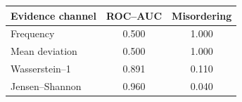 \begin{tabular}{lcc}
\toprule
Evidence channel & ROC--AUC & Misordering \\
\midrule
Frequency & 0.500 & 1.000 \\
Mean deviation & 0.500 & 1.000 \\
Wasserstein--1 & 0.891 & 0.110 \\
Jensen--Shannon & 0.960 & 0.040 \\
\bottomrule
\end{tabular}
